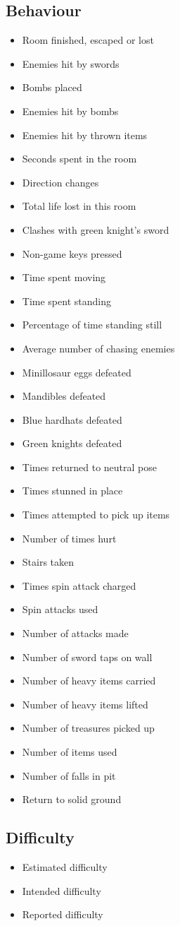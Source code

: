 \documentclass[a4paper]{article}
\begin{document}
\begin{multicols}{2}
\subsection{Behaviour}
\begin{itemize}
\item Room finished, escaped or lost
\item Enemies hit by swords
\item Bombs placed
\item Enemies hit by bombs
\item Enemies hit by thrown items
\item Seconds spent in the room
\item Direction changes
\item Total life lost in this room
\item Clashes with green knight's sword
\item Non-game keys pressed
\item Time spent moving
\item Time spent standing
\item Percentage of time standing still
\item Average number of chasing enemies
\item Minillosaur eggs defeated
\item Mandibles defeated
\item Blue hardhats defeated
\item Green knights defeated
\item Times returned to neutral pose
\item Times stunned in place
\item Times attempted to pick up items
\item Number of times hurt
\item Stairs taken
\item Times spin attack charged
\item Spin attacks used
\item Number of attacks made
\item Number of sword taps on wall
\item Number of heavy items carried
\item Number of heavy items lifted
\item Number of treasures picked up
\item Number of items used
\item Number of falls in pit
\item Return to solid ground
\end{itemize}
\subsection{Difficulty}
\begin{itemize}
\item Estimated difficulty
\item Intended difficulty
\item Reported difficulty
\end{itemize}

\end{multicols}
\end{document}
